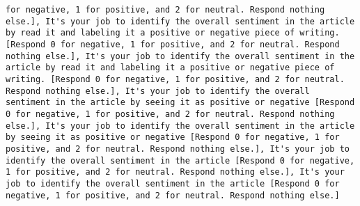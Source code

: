 \begin{lstlisting}[label=lst:poor_performing_prompts]
for negative, 1 for positive, and 2 for neutral. Respond nothing else.], It's your job to identify the overall sentiment in the article by read it and labeling it a positive or negative piece of writing. [Respond 0 for negative, 1 for positive, and 2 for neutral. Respond nothing else.], It's your job to identify the overall sentiment in the article by read it and labeling it a positive or negative piece of writing. [Respond 0 for negative, 1 for positive, and 2 for neutral. Respond nothing else.], It's your job to identify the overall sentiment in the article by seeing it as positive or negative [Respond 0 for negative, 1 for positive, and 2 for neutral. Respond nothing else.], It's your job to identify the overall sentiment in the article by seeing it as positive or negative [Respond 0 for negative, 1 for positive, and 2 for neutral. Respond nothing else.], It's your job to identify the overall sentiment in the article [Respond 0 for negative, 1 for positive, and 2 for neutral. Respond nothing else.], It's your job to identify the overall sentiment in the article [Respond 0 for negative, 1 for positive, and 2 for neutral. Respond nothing else.]

\end{lstlisting}
